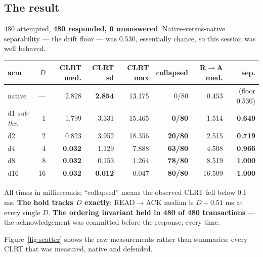 \documentclass[10pt,a4paper,oneside]{article}
\newcommand{\num}[1]{\mbox{#1}}
\begin{document}
\subsection{The result}

480 attempted, \textbf{480 responded, 0 unanswered}. Native-versus-native separability ---
the drift floor --- was \num{0.530}, essentially chance, so this session was well behaved.

\begin{center}\small
\begin{tabular}{lrrrrrrr}
\toprule
\textbf{arm} & \textbf{$D$} & \textbf{CLRT med.} & \textbf{CLRT sd} & \textbf{CLRT max}
& \textbf{collapsed} & \textbf{R$\to$A med.} & \textbf{sep.} \\
\midrule
native      & ---  & \num{2.828} & \textbf{\num{2.854}} & \num{13.175} & 0/80  & \num{0.453}  & (floor \num{0.530}) \\
d1 \emph{sub-thr.} & 1 & \num{1.799} & \num{3.331} & \num{15.465} & \textbf{0/80}  & \num{1.514}  & \textbf{\num{0.649}} \\
d2          & 2    & \num{0.823} & \num{3.952} & \num{18.356} & \textbf{20/80} & \num{2.515}  & \textbf{\num{0.719}} \\
d4          & 4    & \textbf{\num{0.032}} & \num{1.129} & \num{7.888} & \textbf{63/80} & \num{4.508} & \textbf{\num{0.966}} \\
d8          & 8    & \textbf{\num{0.032}} & \num{0.153} & \num{1.264} & \textbf{78/80} & \num{8.519} & \textbf{\num{1.000}} \\
d16         & 16   & \textbf{\num{0.032}} & \textbf{\num{0.012}} & \num{0.047} & \textbf{80/80} & \num{16.509} & \textbf{\num{1.000}} \\
\bottomrule
\end{tabular}
\end{center}

All times in milliseconds; ``collapsed'' means the observed CLRT fell below \num{0.1} ms.
\textbf{The hold tracks $D$ exactly}: READ$\to$ACK median is $D+\num{0.51}$ ms at every
single $D$. \textbf{The ordering invariant held in 480 of 480 transactions} --- the
acknowledgement was committed before the response, every time.

Figure~\ref{fig:scatter} shows the raw measurements rather than summaries: every CLRT that
was measured, native and defended.
\end{document}

